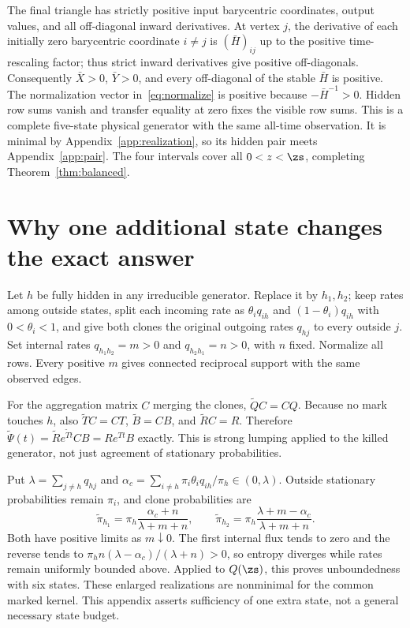 The final triangle has strictly positive input barycentric coordinates, output values, and all off-diagonal inward derivatives. At vertex $j$, the derivative of each initially zero barycentric coordinate $i\ne j$ is $(\bar H)_{ij}$ up to the positive time-rescaling factor; thus strict inward derivatives give positive off-diagonals. Consequently $\bar X>0$, $\bar Y>0$, and every off-diagonal of the stable $\bar H$ is positive. The normalization vector in~\eqref{eq:normalize} is positive because $-\bar H^{-1}>0$. Hidden row sums vanish and transfer equality at zero fixes the visible row sums. This is a complete five-state physical generator with the same all-time observation. It is minimal by Appendix~\ref{app:realization}, so its hidden pair meets Appendix~\ref{app:pair}. The four intervals cover all $0<z<\zs$, completing Theorem~\ref{thm:balanced}.

\section{Why one additional state changes the exact answer}\label{app:split}
Let $h$ be fully hidden in any irreducible generator. Replace it by $h_1,h_2$; keep rates among outside states, split each incoming rate as $\theta_iq_{ih}$ and $(1-\theta_i)q_{ih}$ with $0<\theta_i<1$, and give both clones the original outgoing rates $q_{hj}$ to every outside $j$. Set internal rates $q_{h_1h_2}=m>0$ and $q_{h_2h_1}=n>0$, with $n$ fixed. Normalize all rows. Every positive $m$ gives connected reciprocal support with the same observed edges.

For the aggregation matrix $C$ merging the clones, $\widetilde Q C=CQ$. Because no mark touches $h$, also $\widetilde T C=CT$, $\widetilde B=CB$, and $\widetilde R C=R$. Therefore $\widetilde\Psi(t)=\widetilde R e^{\widetilde Tt}CB=Re^{Tt}B$ exactly. This is strong lumping applied to the killed generator, not just agreement of stationary probabilities.

Put $\lambda=\sum_{j\ne h}q_{hj}$ and $\alpha_c=\sum_{i\ne h}\pi_i\theta_iq_{ih}/\pi_h\in(0,\lambda)$. Outside stationary probabilities remain $\pi_i$, and clone probabilities are
\begin{equation}
 \widetilde\pi_{h_1}=\pi_h\frac{\alpha_c+n}{\lambda+m+n},\qquad
 \widetilde\pi_{h_2}=\pi_h\frac{\lambda+m-\alpha_c}{\lambda+m+n}.
\end{equation}
Both have positive limits as $m\downarrow0$. The first internal flux tends to zero and the reverse tends to $\pi_hn(\lambda-\alpha_c)/(\lambda+n)>0$, so entropy diverges while rates remain uniformly bounded above. Applied to $Q(\zs)$, this proves unboundedness with six states. These enlarged realizations are nonminimal for the common marked kernel. This appendix asserts sufficiency of one extra state, not a general necessary state budget.
